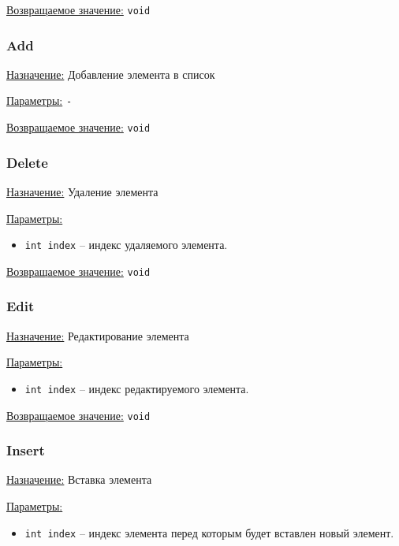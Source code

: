 \underline{Возвращаемое значение:} \verb|void|


\subsubsection*{Add}

\underline{Назначение:} Добавление элемента в список

\underline{Параметры:} \verb|-|

\underline{Возвращаемое значение:} \verb|void|


\subsubsection*{Delete}

\underline{Назначение:} Удаление элемента

\underline{Параметры:} 

\begin{itemize}
    \item \verb|int index| -- индекс удаляемого элемента.
\end{itemize}

\underline{Возвращаемое значение:} \verb|void|


\subsubsection*{Edit}

\underline{Назначение:} Редактирование элемента

\underline{Параметры:} 

\begin{itemize}
    \item \verb|int index| -- индекс редактируемого элемента.
\end{itemize}

\underline{Возвращаемое значение:} \verb|void|


\subsubsection*{Insert}

\underline{Назначение:} Вставка элемента

\underline{Параметры:} 

\begin{itemize}
    \item \verb|int index| -- индекс 
    элемента перед которым будет вставлен новый элемент.
\end{itemize}


